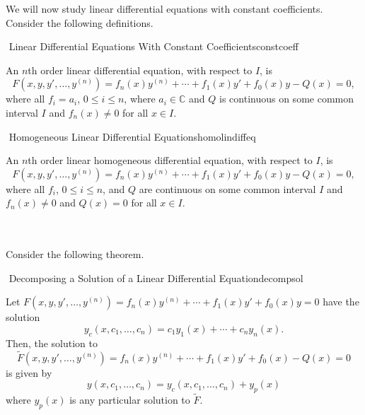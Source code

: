         We will now study linear differential equations with constant coefficients. Consider the following definitions.
        \begin{definition}{\Stop\,\,Linear Differential Equations With Constant Coefficients}{constcoeff}

            An \(n\)th order linear differential equation, with respect to \(I\), is 
            \begin{equation*}
                F(x,y,y',\ldots,y^{(n)})=f_n(x)y^{(n)}+\cdots+f_1(x)y'+f_0(x)y-Q(x)=0,
            \end{equation*}
            where all \(f_i=a_i\), \(0\leq i\leq n\), where \(a_i\in\mathbb{C}\) and \(Q\) is continuous on some common interval \(I\) and \(f_n(x)\neq0\) for all \(x\in I\).
            
        \end{definition}
        \begin{definition}{\Stop\,\,Homogeneous Linear Differential Equations}{homolindiffeq}

            An \(n\)th order linear homogeneous differential equation, with respect to \(I\), is 
            \begin{equation*}
                F(x,y,y',\ldots,y^{(n)})=f_n(x)y^{(n)}+\cdots+f_1(x)y'+f_0(x)y-Q(x)=0,
            \end{equation*}
            where all \(f_i\), \(0\leq i\leq n\), and \(Q\) are continuous on some common interval \(I\) and \(f_n(x)\neq0\) and \(Q(x)=0\) for all \(x\in I\). 
            
        \end{definition}
        \vphantom
        \\
        \\
        Consider the following theorem.
        \begin{theorem}{\Stop\,\,Decomposing a Solution of a Linear Differential Equation}{decompsol}

            Let \(F(x,y,y',\ldots,y^{(n)})=f_n(x)y^{(n)}+\cdots+f_1(x)y'+f_0(x)y=0\) have the solution
            \begin{equation*}
                y_c(x,c_1,\ldots,c_n)=c_1y_1(x)+\cdots+c_ny_n(x).
            \end{equation*}
            Then, the solution to
            \begin{equation*}
                \tilde{F}(x,y,y',\ldots,y^{(n)})=f_n(x)y^{(n)}+\cdots+f_1(x)y'+f_0(x)-Q(x)=0
            \end{equation*}
            is given by
            \begin{equation*}
                y(x,c_1,\ldots,c_n)=y_c(x,c_1,\ldots,c_n)+y_p(x)
            \end{equation*}
            where \(y_p(x)\) is any particular solution to \(\tilde{F}\).

        \end{theorem}

